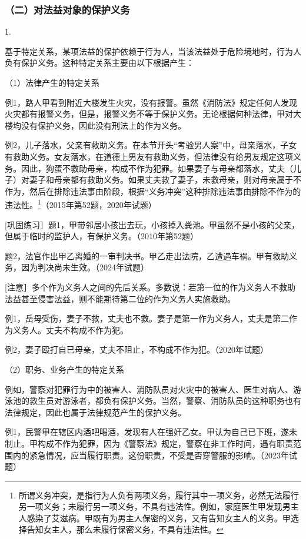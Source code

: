\subsubsection*{（二）对法益对象的保护义务}

1.

基于特定关系，某项法益的保护依赖于行为人，当该法益处于危险境地时，行为人负有保护义务。这种特定关系主要由以下根据产生：

（1）法律产生的特定关系

例1，路人甲看到附近大楼发生火灾，没有报警。虽然《消防法》规定任何人发现火灾都有报警义务，但是，报警义务不等于保护义务。无论根据何种法律，甲对大楼均没有保护义务，因此没有刑法上的作为义务。

例2，儿子落水，父亲有救助义务。在本节开头“考验男人案”中，母亲落水，子女有救助义务。女友落水，在道德上男友有救助义务，但法律没有给男友规定这项义务。因此，狗蛋不救助母亲，构成不作为犯罪。如果妻子与母亲都落水，丈夫（儿子）对妻子和母亲都有救助义务。如果丈夫救了妻子，未救母亲，则对母亲属于不作为，然后在排除违法事由阶段，根据“义务冲突”这种排除违法事由排除不作为的违法性。\footnote{所谓义务冲突，是指行为人负有两项义务，履行其中一项义务，必然无法履行另一项义务；未履行另一项义务，不具有违法性。例如，家庭医生甲发现男主人感染了艾滋病。甲既有为男主人保密的义务，又有告知女主人的义务。甲选择告知女主人，那么未履行保密义务，不具有违法性。}（2015年第52题，2020年试题）

[巩固练习］题1，甲带邻居小孩出去玩，小孩掉入粪池。甲虽然不是小孩的父亲，但属于临时的监护人，有保护义务。（2010年第52题）

题2，法官作出甲乙离婚的一审判决书。甲乙走出法院，乙遭遇车祸。甲有救助义务，因为判决尚未生效。（2024年试题）

[注意］多个作为义务人之间的先后关系。多数说：若第一位的作为义务人不救助法益甚至侵害法益，则不能期待第二位的作为义务人实施救助。

例1，岳母受伤，妻子不救，丈夫也不救。妻子是第一作为义务人，丈夫是第二作为义务人。丈夫不构成不作为犯。

例2，妻子殴打自已母亲，丈夫不阻止，不构成不作为犯。（2020年试题）

（2）职务、业务产生的特定关系

例如，警察对犯罪行为中的被害人、消防队员对火灾中的被害人、医生对病人、游泳池的救生员对游泳者，都负有保护义务。当然，警察、消防队员的这种职务也有法律规定，因此也属于法律规范产生的保护义务。

例1，民警甲在辖区内酒吧喝酒，发现有人在强奸乙女。甲认为自己已下班，遂未制止。甲构成不作为犯罪，因为《警察法》规定，警察在非工作时间，遇有职责范围内的紧急情况，应当履行职责。这份职责，不受是否穿警服的影响。（2023年试题）

